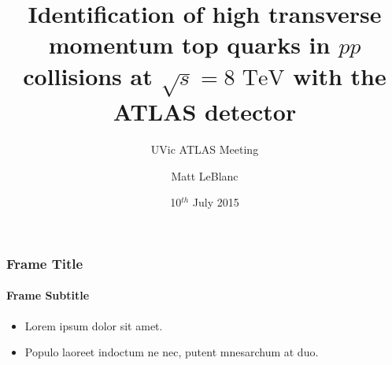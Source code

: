 %
%



\title[Top-Tagging Approval]{Identification of high transverse momentum top quarks in $pp$ collisions at $\sqrt{s}=8\text{ TeV}$ with the ATLAS detector}
\subtitle{UVic ATLAS Meeting}
\author[MLB]{Matt LeBlanc}
\date[2015-07-10]{10$^{th}$ July 2015}





{
%
\begin{frame}[plain]
	\titlepage
\end{frame}
}

\begin{frame}
	\frametitle{Frame Title}
	\framesubtitle{Frame Subtitle}
	\begin{itemize}
		\item Lorem ipsum dolor sit amet.
		\item Populo laoreet indoctum ne nec, putent mnesarchum at duo.
	\end{itemize}
\end{frame}


